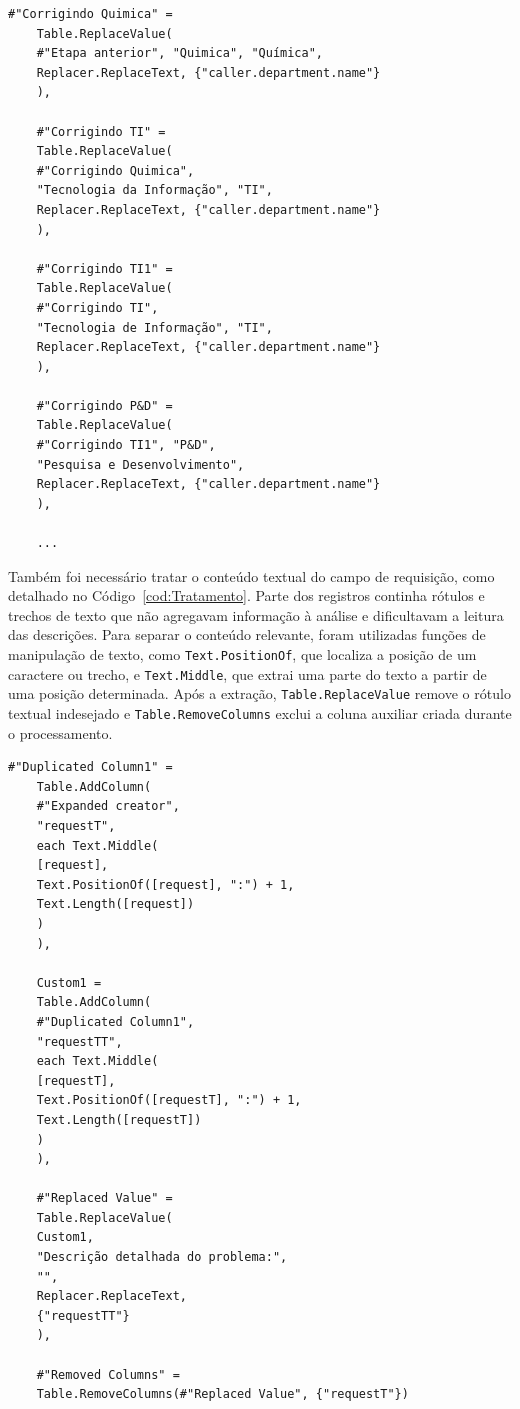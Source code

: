 \begin{lstlisting}[caption={Trecho de código para padronização dos nomes dos departamentos.}, label = {cod:Padronizacao}]
	#"Corrigindo Quimica" =
	Table.ReplaceValue(
	#"Etapa anterior", "Quimica", "Química",
	Replacer.ReplaceText, {"caller.department.name"}
	),
	
	#"Corrigindo TI" =
	Table.ReplaceValue(
	#"Corrigindo Quimica",
	"Tecnologia da Informação", "TI",
	Replacer.ReplaceText, {"caller.department.name"}
	),
	
	#"Corrigindo TI1" =
	Table.ReplaceValue(
	#"Corrigindo TI",
	"Tecnologia de Informação", "TI",
	Replacer.ReplaceText, {"caller.department.name"}
	),
	
	#"Corrigindo P&D" =
	Table.ReplaceValue(
	#"Corrigindo TI1", "P&D",
	"Pesquisa e Desenvolvimento",
	Replacer.ReplaceText, {"caller.department.name"}
	),
	
	...
\end{lstlisting}


Também foi necessário tratar o conteúdo textual do campo de requisição, como detalhado no Código~\ref{cod:Tratamento}. Parte dos registros continha rótulos e trechos de texto que não agregavam informação à análise e dificultavam a leitura das descrições. Para separar o conteúdo relevante, foram utilizadas funções de manipulação de texto, como \texttt{Text.PositionOf}, que localiza a posição de um caractere ou trecho, e \texttt{Text.Middle}, que extrai uma parte do texto a partir de uma posição determinada. Após a extração, \texttt{Table.ReplaceValue} remove o rótulo textual indesejado e \texttt{Table.RemoveColumns} exclui a coluna auxiliar criada durante o processamento.\\

\begin{lstlisting}[caption={Tratamento do campo de requisição.}, label = {cod:Tratamento}]
	#"Duplicated Column1" =
	Table.AddColumn(
	#"Expanded creator",
	"requestT",
	each Text.Middle(
	[request],
	Text.PositionOf([request], ":") + 1,
	Text.Length([request])
	)
	),
	
	Custom1 =
	Table.AddColumn(
	#"Duplicated Column1",
	"requestTT",
	each Text.Middle(
	[requestT],
	Text.PositionOf([requestT], ":") + 1,
	Text.Length([requestT])
	)
	),
	
	#"Replaced Value" =
	Table.ReplaceValue(
	Custom1,
	"Descrição detalhada do problema:",
	"",
	Replacer.ReplaceText,
	{"requestTT"}
	),
	
	#"Removed Columns" =
	Table.RemoveColumns(#"Replaced Value", {"requestT"})
\end{lstlisting}


